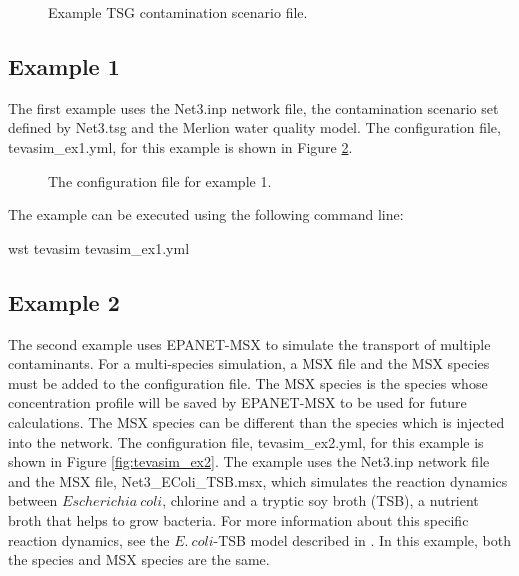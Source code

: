 \begin{figure}[h!]
  \caption{Example TSG contamination scenario file.}
  \label{fig:Net3tsg}
\end{figure}

\subsection{Example 1}

The first example uses the Net3.inp network file, the contamination scenario set defined by Net3.tsg 
and the Merlion water quality model. The configuration file, tevasim\_ex1.yml, for this example is shown in Figure \ref{fig:tevasim_ex1}.  

\begin{figure}[h!]
  \caption{The  configuration file for example 1.}
  \label{fig:tevasim_ex1}
\end{figure}

The example can be executed using the following command line:

\begin{unknownListing}
wst tevasim tevasim_ex1.yml
\end{unknownListing}

\FloatBarrier 
\subsection{Example 2}

The second example uses EPANET-MSX to simulate the transport of multiple contaminants. 
For a multi-species simulation, a MSX file and the MSX species must be added to the 
 configuration file. The MSX species is the species whose concentration profile
will be saved by EPANET-MSX to be used for future calculations. The MSX species can be different
than the species which is injected into the network. The configuration file, tevasim\_ex2.yml, 
for this example is shown in Figure \ref{fig:tevasim_ex2}. The example uses the Net3.inp network file 
and the MSX file, Net3\_EColi\_TSB.msx, which simulates the reaction dynamics between
$Escherichia~coli$, chlorine and a tryptic soy broth (TSB), a nutrient broth that helps to grow bacteria. 
For more information about this specific reaction dynamics, see the $E.~coli$-TSB model 
described in \citet{MurrayAdcockRiceUberHatchett11}. In this example, both the species and MSX species are the
same.

